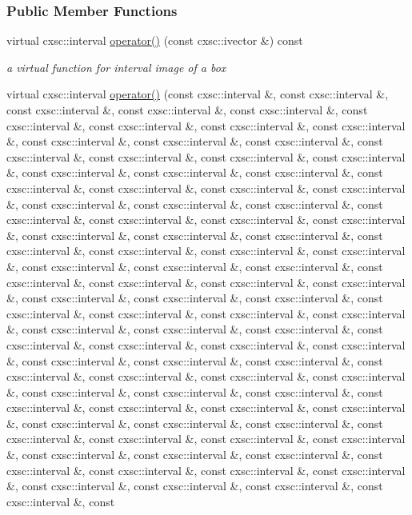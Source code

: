 \subsubsection*{\-Public \-Member \-Functions}
\begin{DoxyCompactItemize}
\item 
virtual cxsc\-::interval \hyperlink{classsubpavings_1_1MappedFobj1000D_acbbf3bd4cf2d4d00233133409877ee52}{operator()} (const cxsc\-::ivector \&) const 
\begin{DoxyCompactList}\small\item\em a virtual function for interval image of a box \end{DoxyCompactList}\item 
virtual cxsc\-::interval \hyperlink{classsubpavings_1_1MappedFobj1000D_a670902de15082329951f7992f5017205}{operator()} (const cxsc\-::interval \&, const cxsc\-::interval \&, const cxsc\-::interval \&, const cxsc\-::interval \&, const cxsc\-::interval \&, const cxsc\-::interval \&, const cxsc\-::interval \&, const cxsc\-::interval \&, const cxsc\-::interval \&, const cxsc\-::interval \&, const cxsc\-::interval \&, const cxsc\-::interval \&, const cxsc\-::interval \&, const cxsc\-::interval \&, const cxsc\-::interval \&, const cxsc\-::interval \&, const cxsc\-::interval \&, const cxsc\-::interval \&, const cxsc\-::interval \&, const cxsc\-::interval \&, const cxsc\-::interval \&, const cxsc\-::interval \&, const cxsc\-::interval \&, const cxsc\-::interval \&, const cxsc\-::interval \&, const cxsc\-::interval \&, const cxsc\-::interval \&, const cxsc\-::interval \&, const cxsc\-::interval \&, const cxsc\-::interval \&, const cxsc\-::interval \&, const cxsc\-::interval \&, const cxsc\-::interval \&, const cxsc\-::interval \&, const cxsc\-::interval \&, const cxsc\-::interval \&, const cxsc\-::interval \&, const cxsc\-::interval \&, const cxsc\-::interval \&, const cxsc\-::interval \&, const cxsc\-::interval \&, const cxsc\-::interval \&, const cxsc\-::interval \&, const cxsc\-::interval \&, const cxsc\-::interval \&, const cxsc\-::interval \&, const cxsc\-::interval \&, const cxsc\-::interval \&, const cxsc\-::interval \&, const cxsc\-::interval \&, const cxsc\-::interval \&, const cxsc\-::interval \&, const cxsc\-::interval \&, const cxsc\-::interval \&, const cxsc\-::interval \&, const cxsc\-::interval \&, const cxsc\-::interval \&, const cxsc\-::interval \&, const cxsc\-::interval \&, const cxsc\-::interval \&, const cxsc\-::interval \&, const cxsc\-::interval \&, const cxsc\-::interval \&, const cxsc\-::interval \&, const cxsc\-::interval \&, const cxsc\-::interval \&, const cxsc\-::interval \&, const cxsc\-::interval \&, const cxsc\-::interval \&, const cxsc\-::interval \&, const cxsc\-::interval \&, const cxsc\-::interval \&, const cxsc\-::interval \&, const cxsc\-::interval \&, const cxsc\-::interval \&, const cxsc\-::interval \&, const cxsc\-::interval \&, const cxsc\-::interval \&, const cxsc\-::interval \&, const cxsc\-::interval \&, const cxsc\-::interval \&, const cxsc\-::interval \&, const cxsc\-::interval \&, const cxsc\-::interval \&, const cxsc\-::interval \&, const cxsc\-::interval \&, const cxsc\-::interval \&, const cxsc\-::interval \&, const cxsc\-::interval \&, const cxsc\-::interval \&, const 
\end{DoxyCompactItemize}
